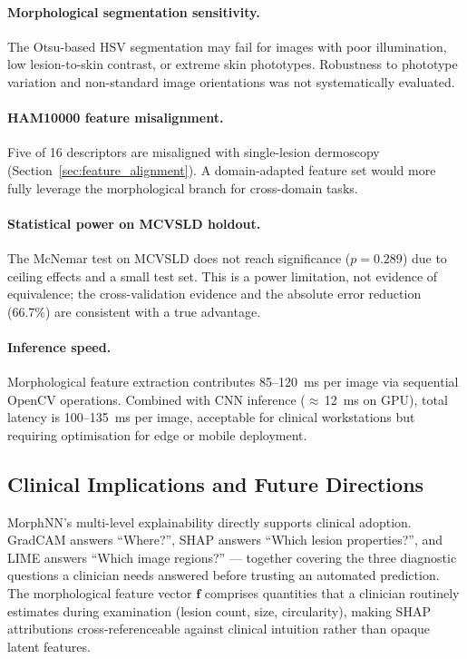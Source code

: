 \documentclass[preprint,12pt]{elsarticle}
\begin{document}
\paragraph{Morphological segmentation sensitivity.}
The Otsu-based HSV segmentation may fail for images with poor
illumination, low lesion-to-skin contrast, or extreme skin phototypes.
Robustness to phototype variation and non-standard image orientations
was not systematically evaluated.

\paragraph{HAM10000 feature misalignment.}
Five of 16 descriptors are misaligned with single-lesion dermoscopy
(Section~\ref{sec:feature_alignment}).  A domain-adapted feature set
would more fully leverage the morphological branch for cross-domain tasks.

\paragraph{Statistical power on MCVSLD holdout.}
The McNemar test on MCVSLD does not reach significance ($p = 0.289$)
due to ceiling effects and a small test set.  This is a power limitation,
not evidence of equivalence; the cross-validation evidence and the
absolute error reduction (66.7\%) are consistent with a true advantage.

\paragraph{Inference speed.}
Morphological feature extraction contributes 85--120~ms per image via
sequential OpenCV operations.  Combined with CNN inference ($\approx$\,12~ms
on GPU), total latency is 100--135~ms per image, acceptable for clinical
workstations but requiring optimisation for edge or mobile deployment.


\subsection{Clinical Implications and Future Directions}
\label{sec:clinical}

MorphNN's multi-level explainability directly supports clinical adoption.
GradCAM answers ``Where?'', SHAP answers ``Which lesion properties?'', and
LIME answers ``Which image regions?'' --- together covering the three
diagnostic questions a clinician needs answered before trusting an
automated prediction.  The morphological feature vector $\mathbf{f}$
comprises quantities that a clinician routinely estimates during
examination (lesion count, size, circularity), making SHAP attributions
cross-referenceable against clinical intuition rather than opaque latent
features.
\end{document}
